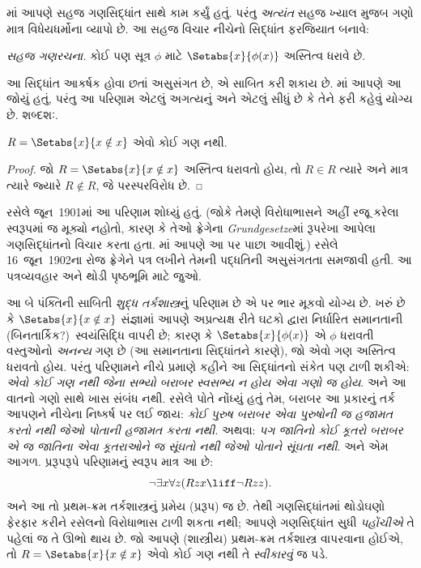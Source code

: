 \documentclass[../../../include/open-logic-section]{subfiles}
\begin{document}

માં આપણે સહજ ગણસિદ્ધાંત સાથે કામ કર્યું હતું.
પરંતુ \emph{અત્યંત} સહજ ખ્યાલ મુજબ ગણો માત્ર વિધેયધર્મોના વ્યાપો છે.
આ સહજ વિચાર નીચેનો સિદ્ધાંત ફરજિયાત બનાવે:

\begin{defish}
  \emph{સહજ ગણરચના.} કોઈ પણ સૂત્ર $\phi$ માટે $\Setabs{x}{\phi(x)}$ અસ્તિત્વ ધરાવે છે.
\end{defish}

આ સિદ્ધાંત આકર્ષક હોવા છતાં અસુસંગત છે, એ સાબિત કરી શકાય છે.
માં આપણે આ જોયું હતું, પરંતુ આ પરિણામ
એટલું અગત્યનું અને એટલું સીધું છે કે તેને ફરી કહેવું યોગ્ય છે.
શબ્દશઃ.

\begin{thm}[રસેલનો વિરોધાભાસ]
$R = \Setabs{x}{x \notin x}$ એવો કોઈ ગણ નથી.
\end{thm}

\begin{proof}
જો $R = \Setabs{x}{x \notin x}$ અસ્તિત્વ ધરાવતો હોય, તો
$R \in R$ ત્યારે અને માત્ર ત્યારે જ્યારે $R \notin R$, જે પરસ્પરવિરોધ છે.
\end{proof}

રસેલે જૂન~1901માં આ પરિણામ શોધ્યું હતું. (જોકે તેમણે વિરોધાભાસને
અહીં રજૂ કરેલા સ્વરૂપમાં જ મૂક્યો નહોતો, કારણ કે તેઓ ફ્રેગેના
\emph{Grundgesetze}માં રૂપરેખા આપેલા ગણસિદ્ધાંતનો વિચાર કરતા હતા.
માં આપણે આ પર પાછા આવીશું.) રસેલે 16~જૂન~1902ના
રોજ ફ્રેગેને પત્ર લખીને તેમની પદ્ધતિની અસુસંગતતા સમજાવી હતી.
આ પત્રવ્યવહાર અને થોડી પૃષ્ઠભૂમિ માટે
\citet[pp.~124--8]{Heijenoort1967} જુઓ.

આ બે પંક્તિની સાબિતી \emph{શુદ્ધ તર્કશાસ્ત્ર}નું પરિણામ છે એ પર
ભાર મૂકવો યોગ્ય છે. ખરું છે કે $\Setabs{x}{x \notin x}$ સંજ્ઞામાં
આપણે અપ્રત્યક્ષ રીતે ઘટકો દ્વારા નિર્ધારિત સમાનતાની (બિનતાર્કિક?)\
સ્વયંસિદ્ધિ વાપરી છે; કારણ કે $\Setabs{x}{\phi(x)}$ એ $\phi$
ધરાવતી વસ્તુઓનો \emph{અનન્ય} ગણ છે (આ સમાનતાના સિદ્ધાંતને કારણે),
જો એવો ગણ અસ્તિત્વ ધરાવતો હોય. પરંતુ પરિણામને નીચે પ્રમાણે કહીને
આ સિદ્ધાંતનો સંકેત પણ ટાળી શકીએ:
\emph{એવો કોઈ ગણ નથી જેના સભ્યો બરાબર સ્વસભ્ય ન હોય એવા ગણો જ હોય}.
અને આ વાતનો ગણો સાથે ખાસ સંબંધ નથી. રસેલે પોતે નોંધ્યું હતું તેમ,
બરાબર આ પ્રકારનું તર્ક આપણને નીચેના નિષ્કર્ષ પર લઈ જાય:
\emph{કોઈ પુરુષ બરાબર એવા પુરુષોની જ હજામત કરતો નથી જેઓ પોતાની
હજામત કરતા નથી}. અથવા: \emph{પગ જાતિનો કોઈ કૂતરો બરાબર એ જ જાતિના
એવા કૂતરાઓને જ સૂંઘતો નથી જેઓ પોતાને સૂંઘતા નથી}. અને એમ આગળ.
પ્રરૂપરૂપે પરિણામનું સ્વરૂપ માત્ર આ છે:
\[
\lnot \exists x \forall z(Rzx \liff \lnot R zz).
\]
અને આ તો પ્રથમ-ક્રમ તર્કશાસ્ત્રનું પ્રમેય (પ્રરૂપ) જ છે. તેથી
ગણસિદ્ધાંતમાં થોડોઘણો ફેરફાર કરીને રસેલનો વિરોધાભાસ ટાળી શકતા નથી;
આપણે ગણસિદ્ધાંત સુધી \emph{પહોંચીએ} તે પહેલાં જ તે ઊભો થાય છે.
જો આપણે (શાસ્ત્રીય) પ્રથમ-ક્રમ તર્કશાસ્ત્ર વાપરવાના હોઈએ, તો
$R = \Setabs{x}{x\notin x}$ એવો કોઈ ગણ નથી તે \emph{સ્વીકારવું}
જ પડે.
\end{document}
